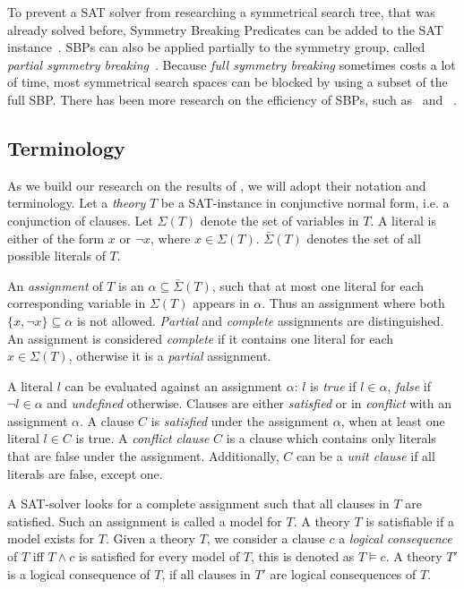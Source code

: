 To prevent a SAT solver from researching a symmetrical search tree, that was already solved
before, Symmetry Breaking Predicates can be added to the SAT
instance~\cite{sakallah2009symmetry}. SBPs can also be applied partially to the symmetry
group, called \textit{partial symmetry breaking}~\cite{sakallah2009symmetry}. Because
\textit{full symmetry breaking} sometimes costs a lot of time, most symmetrical search
spaces can be blocked by using a subset of the full SBP. There has been more research on
the efficiency of SBPs, such as~\cite{aloul2006efficient,aloul2003shatter,crawford1996symmetry} and
~\cite{sabharwal2005symchaff}.

\subsection{Terminology}
	As we build our research on the results of \cite{devriendt2012symmetry}, we will adopt
	their notation and terminology.
	Let a \emph{theory} $T$ be a SAT-instance in conjunctive normal form, i.e. a conjunction
	of clauses.
	Let $\Sigma(T)$ denote the set of variables in $T$.
	A literal is either of the form	$x$ or $\neg x$, where $x \in \Sigma(T)$.
	$\bar\Sigma(T)$ denotes the set of all possible literals of $T$.

	An \emph{assignment} of $T$ is an $\alpha \subseteq \bar\Sigma(T)$, such that at most
	one literal for each corresponding variable in $\Sigma(T)$ appears in $\alpha$.
	Thus an assignment where both $\{x, \neg x\} \subseteq \alpha$ is not allowed.
	\emph{Partial} and \emph{complete} assignments are distinguished.
	An assignment is considered \emph{complete} if it contains one literal for each $x \in \Sigma(T)$,
	otherwise it is a \emph{partial} assignment.

	A literal $l$ can be evaluated against an assignment $\alpha$: $l$ is \emph{true} if $l \in
	\alpha$, \emph{false} if $\neg l \in \alpha$ and \emph{undefined} otherwise.
	Clauses are either \emph{satisfied} or in \emph{conflict} with an assignment $\alpha$.
	A clause $C$ is \emph{satisfied} under the assignment $\alpha$,
	when at least one literal $l \in C$ is true.
	A \emph{conflict clause} $C$ is a clause which contains only literals that are false under the assignment.
	Additionally, $C$ can be a \emph{unit clause} if all literals are false, except one.

	A SAT-solver looks for a complete assignment such that all clauses in $T$ are satisfied.
	Such an assignment is called a model for $T$.
	A theory $T$ is satisfiable if a model exists for $T$.
	Given a theory $T$, we consider a clause $c$ a \emph{logical consequence} of $T$ iff
	$T \wedge c$ is satisfied for every model of $T$, this is denoted as $T \models c$.
	A theory $T'$ is a logical consequence of $T$, if all clauses in $T'$ are logical
	consequences of $T$.

